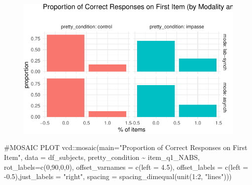 \documentclass[
  letterpaper,
  DIV=11,
  numbers=noendperiod]{scrreprt}
\newenvironment{Shaded}{\begin{snugshade}}{\end{snugshade}}
\newcommand{\AttributeTok}[1]{\textcolor[rgb]{0.40,0.45,0.13}{#1}}
\newcommand{\CommentTok}[1]{\textcolor[rgb]{0.37,0.37,0.37}{#1}}
\newcommand{\DecValTok}[1]{\textcolor[rgb]{0.68,0.00,0.00}{#1}}
\newcommand{\FloatTok}[1]{\textcolor[rgb]{0.68,0.00,0.00}{#1}}
\newcommand{\FunctionTok}[1]{\textcolor[rgb]{0.28,0.35,0.67}{#1}}
\newcommand{\NormalTok}[1]{\textcolor[rgb]{0.00,0.23,0.31}{#1}}
\newcommand{\SpecialCharTok}[1]{\textcolor[rgb]{0.37,0.37,0.37}{#1}}
\newcommand{\StringTok}[1]{\textcolor[rgb]{0.13,0.47,0.30}{#1}}
\begin{document}
\begin{figure}[H]

{\centering \includegraphics{analysis/SGC3A/3_sgc3A_description_files/figure-pdf/VIS-FIRST-ABSOLUTE-2.pdf}

}

\end{figure}

\begin{Shaded}
\begin{Highlighting}[]
\CommentTok{\#MOSAIC PLOT}
\NormalTok{vcd}\SpecialCharTok{::}\FunctionTok{mosaic}\NormalTok{(}\AttributeTok{main=}\StringTok{"Proportion of Correct Responses on First Item"}\NormalTok{,}
            \AttributeTok{data =}\NormalTok{ df\_subjects, pretty\_condition }\SpecialCharTok{\textasciitilde{}}\NormalTok{ item\_q1\_NABS, }\AttributeTok{rot\_labels=}\FunctionTok{c}\NormalTok{(}\DecValTok{0}\NormalTok{,}\DecValTok{90}\NormalTok{,}\DecValTok{0}\NormalTok{,}\DecValTok{0}\NormalTok{), }
            \AttributeTok{offset\_varnames =} \FunctionTok{c}\NormalTok{(}\AttributeTok{left =} \FloatTok{4.5}\NormalTok{), }\AttributeTok{offset\_labels =} \FunctionTok{c}\NormalTok{(}\AttributeTok{left =} \SpecialCharTok{{-}}\FloatTok{0.5}\NormalTok{),}\AttributeTok{just\_labels =} \StringTok{"right"}\NormalTok{,}
            \AttributeTok{spacing =} \FunctionTok{spacing\_dimequal}\NormalTok{(}\FunctionTok{unit}\NormalTok{(}\DecValTok{1}\SpecialCharTok{:}\DecValTok{2}\NormalTok{, }\StringTok{"lines"}\NormalTok{))) }
\end{Highlighting}
\end{Shaded}
\end{document}
